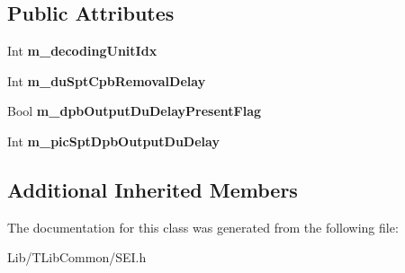 \subsection*{Public Attributes}
\begin{DoxyCompactItemize}
\item 
\mbox{\label{class_s_e_i_decoding_unit_info_a088ca2eda3ecc171d02ec745a75f5649}} 
Int {\bfseries m\+\_\+decoding\+Unit\+Idx}
\item 
\mbox{\label{class_s_e_i_decoding_unit_info_a4cc133831341719ebac47ac50c7f7bea}} 
Int {\bfseries m\+\_\+du\+Spt\+Cpb\+Removal\+Delay}
\item 
\mbox{\label{class_s_e_i_decoding_unit_info_ad9f048d0e73179ac1915cec23cc1d74d}} 
Bool {\bfseries m\+\_\+dpb\+Output\+Du\+Delay\+Present\+Flag}
\item 
\mbox{\label{class_s_e_i_decoding_unit_info_a4f706aa3f85555f03af6b5107574057e}} 
Int {\bfseries m\+\_\+pic\+Spt\+Dpb\+Output\+Du\+Delay}
\end{DoxyCompactItemize}
\subsection*{Additional Inherited Members}


The documentation for this class was generated from the following file\+:\begin{DoxyCompactItemize}
\item 
Lib/\+T\+Lib\+Common/S\+E\+I.\+h\end{DoxyCompactItemize}
